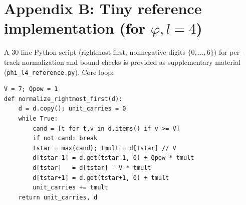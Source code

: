 \documentclass[11pt]{article}
\theoremstyle{definition}
\theoremstyle{remark}
\begin{document}
\section*{Appendix B: Tiny reference implementation (for $\varphi,l=4$)}
A 30-line Python script (rightmost-first, nonnegative digits $\{0,\dots,6\}$) for per-track normalization and bound checks is provided as supplementary material (\texttt{phi\_l4\_reference.py}). Core loop:
\begin{verbatim}
V = 7; Qpow = 1
def normalize_rightmost_first(d):
    d = d.copy(); unit_carries = 0
    while True:
        cand = [t for t,v in d.items() if v >= V]
        if not cand: break
        tstar = max(cand); tmult = d[tstar] // V
        d[tstar-1] = d.get(tstar-1, 0) + Qpow * tmult
        d[tstar]   = d[tstar] - V * tmult
        d[tstar+1] = d.get(tstar+1, 0) + tmult
        unit_carries += tmult
    return unit_carries, d
\end{verbatim}



\end{document}
